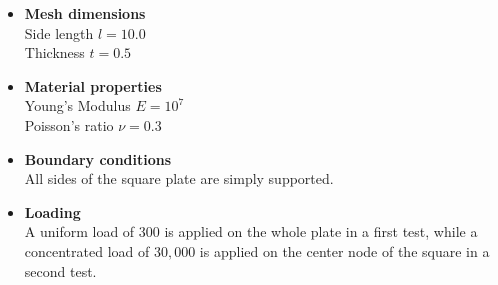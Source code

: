   \begin{itemize}
   \item \textbf{Mesh dimensions}\\
   Side length $l = 10.0$\\
   Thickness $t = 0.5$
    	
   \item \textbf{Material properties}\\
   Young's Modulus $E = 10^7$\\
   Poisson's ratio $\nu = 0.3$
    	
   \item \textbf{Boundary conditions}\\
   All sides of the square plate are simply supported.
    	
   \item \textbf{Loading}\\
   A uniform load of $300$ is applied on the whole plate in a first test, while a concentrated load of $30,000$ is applied on the center node of the square in a second test.
  \end{itemize}
    
